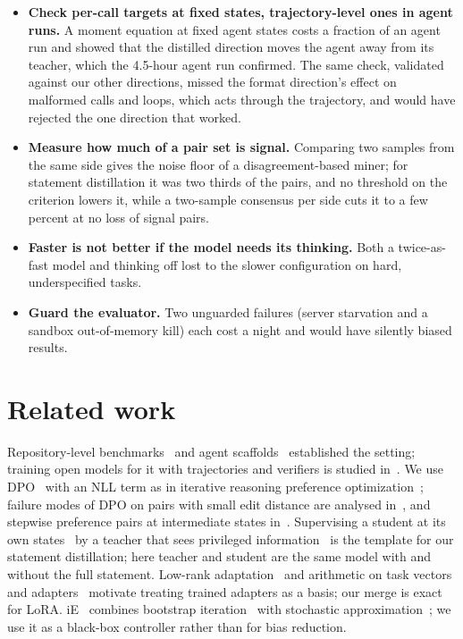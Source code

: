 \documentclass[11pt]{article}
\begin{document}
\begin{itemize}
  \item \textbf{Check per-call targets at fixed states, trajectory-level ones in agent runs.} A moment equation at fixed agent states costs a fraction of an agent run and showed that the distilled direction moves the agent away from its teacher, which the 4.5-hour agent run confirmed. The same check, validated against our other directions, missed the format direction's effect on malformed calls and loops, which acts through the trajectory, and would have rejected the one direction that worked.
  \item \textbf{Measure how much of a pair set is signal.} Comparing two samples from the same side gives the noise floor of a disagreement-based miner; for statement distillation it was two thirds of the pairs, and no threshold on the criterion lowers it, while a two-sample consensus per side cuts it to a few percent at no loss of signal pairs.
  \item \textbf{Faster is not better if the model needs its thinking.} Both a twice-as-fast model and thinking off lost to the slower configuration on hard, underspecified tasks.
  \item \textbf{Guard the evaluator.} Two unguarded failures (server starvation and a sandbox out-of-memory kill) each cost a night and would have silently biased results.
\end{itemize}

\section{Related work}\label{sec:related}

Repository-level benchmarks~\citep{jimenez2024swebench} and agent scaffolds~\citep{yang2024sweagent,xia2024agentless} established the setting; training open models for it with trajectories and verifiers is studied in~\citep{pan2024swegym}. We use DPO~\citep{rafailov2023dpo} with an NLL term as in iterative reasoning preference optimization~\citep{pang2024irpo}; failure modes of DPO on pairs with small edit distance are analysed in~\citep{pal2024smaug,razin2024displacement}, and stepwise preference pairs at intermediate states in~\citep{lai2024stepdpo}. Supervising a student at its own states~\citep{ross2011dagger} by a teacher that sees privileged information~\citep{chen2020cheating} is the template for our statement distillation; here teacher and student are the same model with and without the full statement. Low-rank adaptation~\citep{hu2022lora} and arithmetic on task vectors and adapters~\citep{ilharco2023taskarithmetic,huang2023lorahub} motivate treating trained adapters as a basis; our merge is exact for LoRA. iE~\citep{qin2025ie} combines bootstrap iteration~\citep{martin1992double} with stochastic approximation~\citep{robbins1951sa,blum1954approximation}; we use it as a black-box controller rather than for bias reduction.
\end{document}
